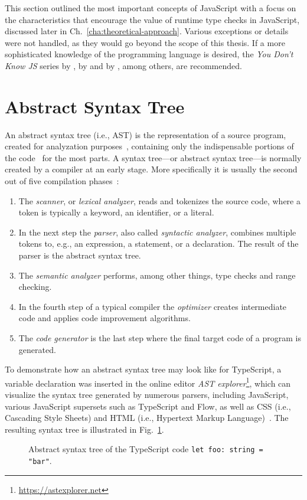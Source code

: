 This section outlined the most important concepts of JavaScript with a focus on the characteristics that encourage the value of runtime type checks in JavaScript, discussed later in Ch.~\ref{cha:theoretical-approach}. Various exceptions or details were not handled, as they would go beyond the scope of this thesis. If a more sophisticated knowledge of the programming language is desired, the \emph{You Don't Know JS} series by \citeauthor{YDKJS:UpAndGoing:Simpson:2015}, \emph{\emph{}} by \citeauthor{JavaScriptTheGoodParts:Crockford:2008} and \emph{\emph{}} by \citeauthor{JavaScriptTheDefinitiveGuide:Flanagan:2011}, among others, are recommended.

\section{Abstract Syntax Tree}
\label{sec:ast}

An abstract syntax tree (i.e., AST) is the representation of a source program, created for analyzation purposes~\cite[p.~99-19]{CompilersAndInterpreters:Kenneth:2004}, containing only the indispensable portions of the code~\cite[p.~12]{FormaleSprachenAbstrakteAutomatenUndCompiler:Wagenknecht:2014} for the most parts. A syntax tree---or abstract syntax tree---is normally created by a compiler at an early stage. More specifically it is usually the second out of five compilation phases~\cite[pp.~99-2--99-3]{CompilersAndInterpreters:Kenneth:2004}: 
\begin{enumerate}
  \item The \emph{scanner}, or \emph{lexical analyzer}, reads and tokenizes the source code, where a token is typically a keyword, an identifier, or a literal.
  \item In the next step the \emph{parser}, also called \emph{syntactic analyzer}, combines multiple tokens to, e.g., an expression, a statement, or a declaration. The result of the parser is the abstract syntax tree.
  \item The \emph{semantic analyzer} performs, among other things, type checks and range checking.
  \item In the fourth step of a typical compiler the \emph{optimizer} creates intermediate code and applies code improvement algorithms.
  \item The \emph{code generator} is the last step where the final target code of a program is generated.
\end{enumerate}
To demonstrate how an abstract syntax tree may look like for TypeScript, a variable declaration was inserted in the online editor \emph{AST explorer}\footnote{\url{https://astexplorer.net}}, which can visualize the syntax tree generated by numerous parsers, including JavaScript, various JavaScript supersets such as TypeScript and Flow, as well as CSS (i.e., Cascading Style Sheets) and HTML (i.e., Hypertext Markup Language)~\cite{ASTExplorer}. The resulting syntax tree is illustrated in Fig.~\ref{fig:ast}.

\begin{figure}
\centering

\caption{Abstract syntax tree of the TypeScript code \texttt{let foo: string = "bar"}.}
\label{fig:ast}
\end{figure}
